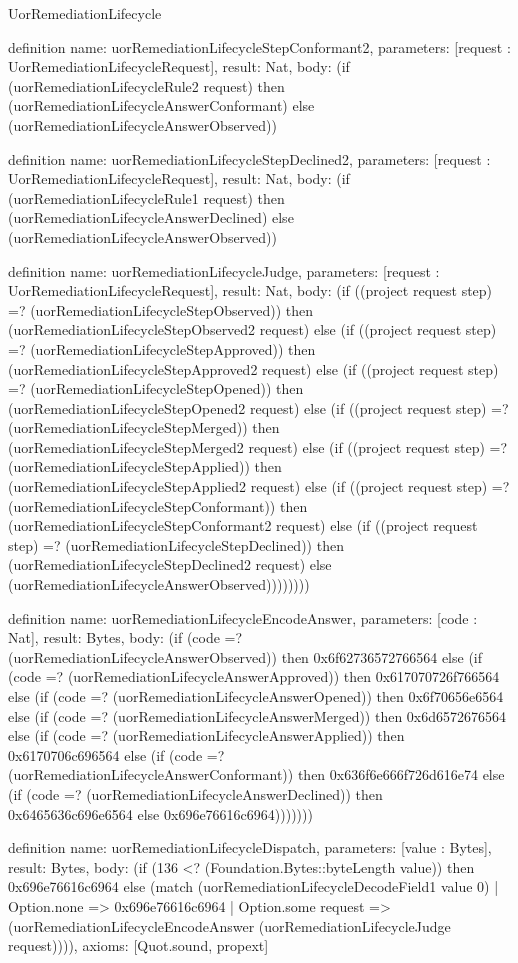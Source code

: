\begin{lexlean}{UorRemediationLifecycle}
\begin{semanticmodule}
definition{
  name: uorRemediationLifecycleStepConformant2,
  parameters: [request : UorRemediationLifecycleRequest],
  result: Nat,
  body: (if (uorRemediationLifecycleRule2 request) then (uorRemediationLifecycleAnswerConformant) else (uorRemediationLifecycleAnswerObserved))
}

definition{
  name: uorRemediationLifecycleStepDeclined2,
  parameters: [request : UorRemediationLifecycleRequest],
  result: Nat,
  body: (if (uorRemediationLifecycleRule1 request) then (uorRemediationLifecycleAnswerDeclined) else (uorRemediationLifecycleAnswerObserved))
}

definition{
  name: uorRemediationLifecycleJudge,
  parameters: [request : UorRemediationLifecycleRequest],
  result: Nat,
  body: (if ((project request step) =? (uorRemediationLifecycleStepObserved)) then (uorRemediationLifecycleStepObserved2 request) else (if ((project request step) =? (uorRemediationLifecycleStepApproved)) then (uorRemediationLifecycleStepApproved2 request) else (if ((project request step) =? (uorRemediationLifecycleStepOpened)) then (uorRemediationLifecycleStepOpened2 request) else (if ((project request step) =? (uorRemediationLifecycleStepMerged)) then (uorRemediationLifecycleStepMerged2 request) else (if ((project request step) =? (uorRemediationLifecycleStepApplied)) then (uorRemediationLifecycleStepApplied2 request) else (if ((project request step) =? (uorRemediationLifecycleStepConformant)) then (uorRemediationLifecycleStepConformant2 request) else (if ((project request step) =? (uorRemediationLifecycleStepDeclined)) then (uorRemediationLifecycleStepDeclined2 request) else (uorRemediationLifecycleAnswerObserved))))))))
}

definition{
  name: uorRemediationLifecycleEncodeAnswer,
  parameters: [code : Nat],
  result: Bytes,
  body: (if (code =? (uorRemediationLifecycleAnswerObserved)) then 0x6f62736572766564 else (if (code =? (uorRemediationLifecycleAnswerApproved)) then 0x617070726f766564 else (if (code =? (uorRemediationLifecycleAnswerOpened)) then 0x6f70656e6564 else (if (code =? (uorRemediationLifecycleAnswerMerged)) then 0x6d6572676564 else (if (code =? (uorRemediationLifecycleAnswerApplied)) then 0x6170706c696564 else (if (code =? (uorRemediationLifecycleAnswerConformant)) then 0x636f6e666f726d616e74 else (if (code =? (uorRemediationLifecycleAnswerDeclined)) then 0x6465636c696e6564 else 0x696e76616c6964)))))))
}

definition{
  name: uorRemediationLifecycleDispatch,
  parameters: [value : Bytes],
  result: Bytes,
  body: (if (136 <? (Foundation.Bytes::byteLength value)) then 0x696e76616c6964 else (match (uorRemediationLifecycleDecodeField1 value 0)
    | Option.none => 0x696e76616c6964
    | Option.some request => (uorRemediationLifecycleEncodeAnswer (uorRemediationLifecycleJudge request)))),
  axioms: [Quot.sound, propext]
}
\end{semanticmodule}
\end{lexlean}
